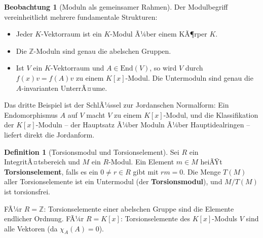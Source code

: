 ﻿\documentclass[a4paper,12pt]{report}
\theoremstyle{definition}
\newtheorem{definition}{Definition}
\newtheorem{beobachtung}{Beobachtung}
\begin{document}
\begin{beobachtung}[Moduln als gemeinsamer Rahmen]
    Der Modulbegriff vereinheitlicht mehrere fundamentale Strukturen:
    \begin{itemize}
        \item[-] Jeder $K$-Vektorraum ist ein $K$-Modul Ã¼ber einem KÃ¶rper $K$.
        \item[-] Die $\mathbb{Z}$-Moduln sind genau die abelschen Gruppen.
        \item[-] Ist $V$ ein $K$-Vektorraum und $A \in \mathrm{End}(V)$,
              so wird $V$ durch $f(x) v = f(A)v$ zu einem $K[x]$-Modul.
              Die Untermoduln sind genau die $A$-invarianten UnterrÃ¤ume.
    \end{itemize}
    Das dritte Beispiel ist der SchlÃ¼ssel zur Jordanschen Normalform:
    Ein Endomorphismus $A$ auf $V$ macht $V$ zu einem $K[x]$-Modul,
    und die Klassifikation der $K[x]$-Moduln -- der Hauptsatz Ã¼ber
    Moduln Ã¼ber Hauptidealringen -- liefert direkt die Jordanform.
\end{beobachtung}

\begin{definition}[Torsionsmodul und Torsionselement]
    Sei $R$ ein IntegritÃ¤tsbereich und $M$ ein $R$-Modul. Ein Element
    $m \in M$ heiÃŸt \textbf{Torsionselement}, falls es ein $0 \neq r \in R$
    gibt mit $rm = 0$. Die Menge $T(M)$ aller Torsionselemente ist ein
    Untermodul (der \textbf{Torsionsmodul}), und $M/T(M)$ ist
    torsionsfrei.

    FÃ¼r $R = \mathbb{Z}$: Torsionselemente einer abelschen Gruppe sind
    die Elemente endlicher Ordnung. FÃ¼r $R = K[x]$: Torsionselemente
    des $K[x]$-Moduls $V$ sind alle Vektoren (da $\chi_A(A) = 0$).
\end{definition}
\end{document}
